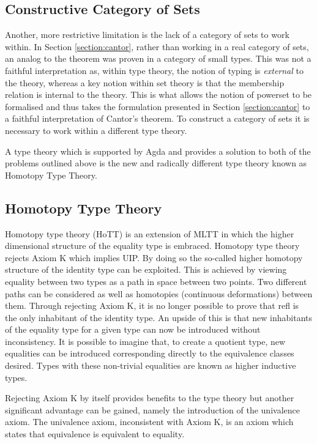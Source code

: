 \subsection{Constructive Category of Sets}
\label{section:sets}
Another, more restrictive limitation is the lack of a category of sets to work
within. In Section \ref{section:cantor}, rather than working in a
real category of sets, an analog to the theorem was proven in a category of
small types. This was not a faithful interpretation as, within type theory, the
notion of typing is \textit{external} to the theory, whereas a key notion within
set theory is that the membership relation is internal to the theory. This is
what allows the notion of powerset to be formalised and thus takes the
formulation presented in Section \ref{section:cantor} to a faithful
interpretation of Cantor's theorem. To construct a category of
sets it is necessary to work within a different type theory.

A type theory which is supported by Agda and provides a solution to both of the
problems outlined above is the new and radically different type theory known as
Homotopy Type Theory.

\subsection{Homotopy Type Theory}
\label{section:hott}
Homotopy type theory (HoTT) \cite{hottbook} is an extension of MLTT in which the
higher dimensional structure of the equality type is embraced. Homotopy type
theory rejects \textsf{Axiom K} which implies UIP. By doing so the so-called higher
homotopy structure of the identity type can be exploited. This is achieved by
viewing equality between two types as a path in space between two points. Two
different paths can be considered as well as homotopies (continuous
deformations) between them. Through rejecting \textsf{Axiom K}, it is no longer
possible to prove that \textsf{refl} is the only inhabitant of the identity
type. An upside of this is that new inhabitants of the equality type for a given
type can now be introduced without inconsistency. It is possible to imagine
that, to create a quotient type, new equalities can be introduced corresponding
directly to the equivalence classes desired. Types with these non-trivial
equalities are known as higher inductive types.

Rejecting \textsf{Axiom K} by itself provides benefits to the type theory but
another significant advantage can be gained, namely the introduction of the
univalence axiom. The univalence axiom, inconsistent with
\textsf{Axiom K}, is an axiom which states that equivalence is equivalent to
equality.

